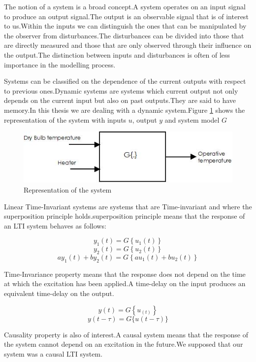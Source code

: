 \documentclass[a4paper,12pt]{report}
\numberwithin{equation}{section}
\begin{document}
The notion of a system is a broad concept.A system operates on an input signal to produce an output signal.The output is an observable signal that is of interest to us.Within the inputs we can distinguish the ones that can be manipulated by the observer from disturbances.The disturbances can be divided into those that are directly measured and those that are only observed through their influence on the output.The distinction between inputs and disturbances is often of less importance in the modelling process.

Systems can be classified on the dependence of the current outputs with respect to previous ones.Dynamic systems are systems which current output not only depends on the current input but also on past outputs.They are said to have memory.In this thesis we are dealing with a dynamic system.Figure \ref{fig:system representation} shows the representation of the system with inputs $u$, output $y$ and system model $G$

\begin{figure}[H]
    \includegraphics[scale=1]{system.jpeg}
    \centering
    \caption{Representation of the system}
    \label{fig:system representation}
\end{figure}


Linear Time-Invariant systems are systems that are Time-invariant and where the superposition principle holds.superposition principle means that the response of an LTI system behaves as follows:
    
\[y_{1}(t)=G\left\{u_{1}(t)\right\} \]
\[y_{2}(t)=G\left\{u_{2}(t)\right\} \]
\[a y_{1}(t)+b y_{2}(t)=G\left\{a u_{1}(t)+b u_{2}(t)\right\}\]

Time-Invariance property means that the response does not depend on the time at which the excitation has been applied.A time-delay on the input produces an equivalent
time-delay on the output.

\[y(t)=G\left\{u_(t)\right\} \]
\[y(t-\tau)=G\{u(t-\tau)\}\]

Causality property is also of interest.A causal system means that the response of the system cannot depend on an excitation in the future.We supposed that our system was a causal LTI system. 
\end{document}
